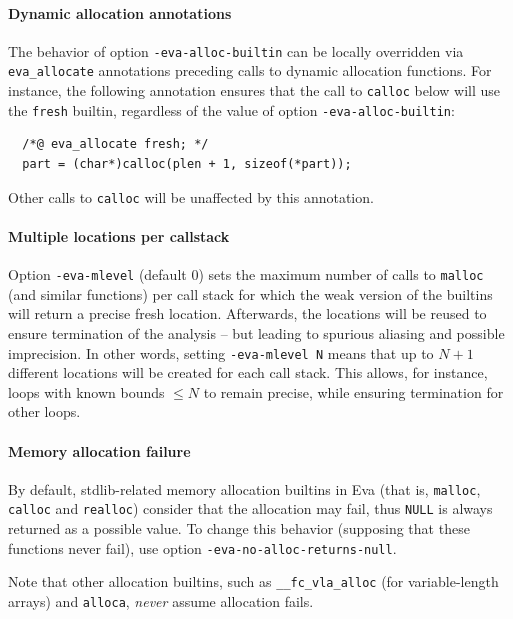 \documentclass[web]{frama-c-book}
\newcommand{\Eva}{\textsf{Eva}}
\begin{document}
\paragraph{Dynamic allocation annotations}

The behavior of option \lstinline|-eva-alloc-builtin| can be locally overridden
via \lstinline|eva_allocate| annotations preceding calls to dynamic allocation
functions.
For instance, the following annotation ensures that the call to
\lstinline|calloc| below will use the \lstinline|fresh| builtin,
regardless of the value of option \lstinline|-eva-alloc-builtin|:

\begin{lstlisting}
  /*@ eva_allocate fresh; */
  part = (char*)calloc(plen + 1, sizeof(*part));
\end{lstlisting}

Other calls to \lstinline|calloc| will be unaffected by this annotation.

\paragraph{Multiple locations per callstack}

Option \lstinline|-eva-mlevel| (default 0) sets the maximum number of calls to
\lstinline|malloc| (and similar functions) per call stack for which the
weak version of the builtins will return a precise fresh location.
Afterwards, the locations will be reused to ensure termination of the analysis --
but leading to spurious aliasing and possible imprecision.
In other words, setting \lstinline|-eva-mlevel N| means that up to $N+1$
different locations will be created for each call stack. This allows,
for instance, loops with known bounds $\leq N$ to remain precise, while ensuring
termination for other loops.

\paragraph{Memory allocation failure}

By default, stdlib-related memory allocation builtins in \Eva{}
(that is, \lstinline|malloc|, \lstinline|calloc| and \lstinline|realloc|)
consider that
the allocation may fail, thus \lstinline|NULL| is always returned as a possible
value. To change this behavior (supposing that these functions never fail),
use option \lstinline|-eva-no-alloc-returns-null|.

Note that other allocation builtins, such as \lstinline|__fc_vla_alloc|
(for variable-length arrays) and \lstinline|alloca|, {\em never} assume
allocation fails.
\end{document}
